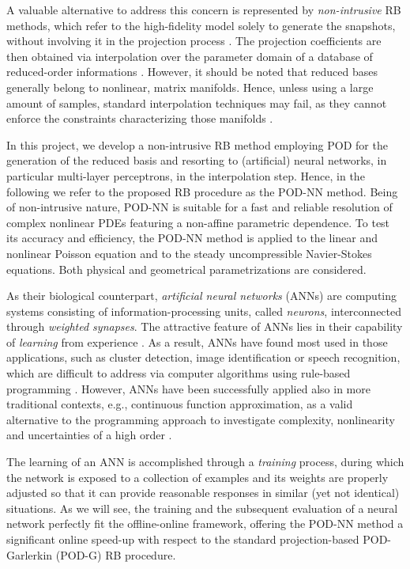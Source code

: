\documentclass[12pt, a4paper, twoside, openright, notitlepage]{report}
\numberwithin{equation}{chapter}
\theoremstyle{theorem}
\theoremstyle{definition}
\theoremstyle{remark}
\theoremstyle{proposition}
\numberwithin{figure}{chapter}
\begin{document}
		A valuable alternative to address this concern is represented by \emph{non-intrusive} RB methods, which refer to the high-fidelity model solely to generate the snapshots, without involving it in the projection process \cite{Chen17}. The projection coefficients are then obtained via interpolation over the parameter domain of a database of reduced-order informations \cite{Cas15}. However, it should be noted that reduced bases generally belong to nonlinear, matrix manifolds. Hence, unless using a large amount of samples, standard interpolation techniques may fail, as they cannot enforce the constraints characterizing those manifolds \cite{Ams10, BNR00}. 
		
		In this project, we develop a non-intrusive RB method employing POD for the generation of the reduced basis and resorting to (artificial) neural networks, in particular multi-layer perceptrons, in the interpolation step. Hence, in the following we refer to the proposed RB procedure as the POD-NN method. Being of non-intrusive nature, POD-NN is suitable for a fast and reliable resolution of complex nonlinear PDEs featuring a non-affine parametric dependence. To test its accuracy and efficiency, the POD-NN method is applied to the linear and nonlinear Poisson equation and to the steady uncompressible Navier-Stokes equations. Both physical and geometrical parametrizations are considered.
		
		As their biological counterpart, \emph{artificial neural networks} (ANNs) \cite{Hay05} are computing systems consisting of information-processing units, called \emph{neurons}, interconnected through \emph{weighted synapses}. The attractive feature of ANNs lies in their capability of \emph{learning} from experience \cite{Kri07}. As a result, ANNs have found most used in those applications, such as cluster detection, image identification or speech recognition, which are difficult to address via computer algorithms using rule-based programming \cite{Mat16}. However, ANNs have been successfully applied also in more traditional contexts, e.g., continuous function approximation, as a valid alternative to the programming approach to investigate complexity, nonlinearity and uncertainties of a high order \cite{Nie15}. 
		
		The learning of an ANN is accomplished through a \emph{training} process, during which the network is exposed to a collection of examples and its weights are properly adjusted so that it can provide reasonable responses in similar (yet not identical) situations. As we will see, the training and the subsequent evaluation of a neural network perfectly fit the offline-online framework, offering the POD-NN method a significant online speed-up with respect to the standard projection-based POD-Garlerkin (POD-G) RB procedure.
		
\end{document}
